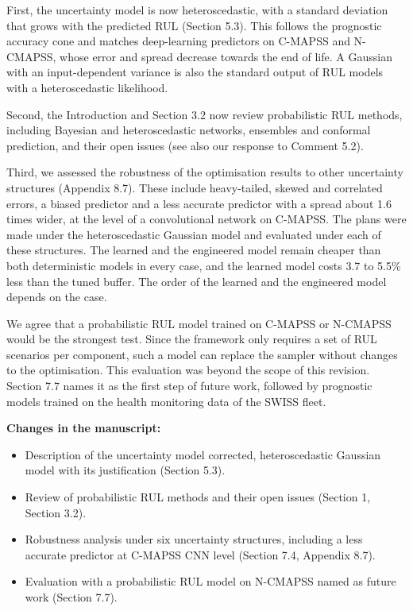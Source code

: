 \documentclass{article}
\newcommand{\changes}{\vspace{0.1cm}\noindent\textbf{Changes in the manuscript:}}
\begin{document}
First, the uncertainty model is now heteroscedastic, with a standard deviation that grows with the predicted RUL (Section 5.3). This follows the prognostic accuracy cone and matches deep-learning predictors on C-MAPSS and N-CMAPSS, whose error and spread decrease towards the end of life. A Gaussian with an input-dependent variance is also the standard output of RUL models with a heteroscedastic likelihood.

Second, the Introduction and Section 3.2 now review probabilistic RUL methods, including Bayesian and heteroscedastic networks, ensembles and conformal prediction, and their open issues (see also our response to Comment 5.2).

Third, we assessed the robustness of the optimisation results to other uncertainty structures (Appendix 8.7). These include heavy-tailed, skewed and correlated errors, a biased predictor and a less accurate predictor with a spread about 1.6 times wider, at the level of a convolutional network on C-MAPSS. The plans were made under the heteroscedastic Gaussian model and evaluated under each of these structures. The learned and the engineered model remain cheaper than both deterministic models in every case, and the learned model costs 3.7 to 5.5\% less than the tuned buffer. The order of the learned and the engineered model depends on the case.

We agree that a probabilistic RUL model trained on C-MAPSS or N-CMAPSS would be the strongest test. Since the framework only requires a set of RUL scenarios per component, such a model can replace the sampler without changes to the optimisation. This evaluation was beyond the scope of this revision. Section 7.7 names it as the first step of future work, followed by prognostic models trained on the health monitoring data of the SWISS fleet.

\changes
\begin{itemize}[nosep]
\item Description of the uncertainty model corrected, heteroscedastic Gaussian model with its justification (Section 5.3).
\item Review of probabilistic RUL methods and their open issues (Section 1, Section 3.2).
\item Robustness analysis under six uncertainty structures, including a less accurate predictor at C-MAPSS CNN level (Section 7.4, Appendix 8.7).
\item Evaluation with a probabilistic RUL model on N-CMAPSS named as future work (Section 7.7).
\end{itemize}
\end{document}
